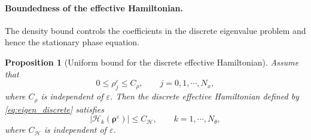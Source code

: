 \documentclass[11pt]{article}
\numberwithin{equation}{section}
\newtheorem{proposition}{Proposition}[section]
\begin{document}
\paragraph{Boundedness of the effective Hamiltonian.}
The density bound controls the coefficients in the discrete eigenvalue problem
and hence the stationary phase equation.

%

\begin{proposition}[Uniform bound for the discrete effective Hamiltonian]
\label{prop:stationary_H_bound}
Assume that
\[
    0\le \rho_j^\varepsilon\le C_\rho,
    \qquad j=0,1,\cdots,N_x,
\]
where \(C_\rho\) is independent of \(\varepsilon\). Then the discrete
effective Hamiltonian defined by \eqref{eq:eigen_discrete} satisfies
\[
    |\mathcal H_k(\boldsymbol\rho^\varepsilon)|
    \le C_{\mathcal H},
    \qquad k=1,\cdots,N_\theta,
\]
where \(C_{\mathcal H}\) is independent of \(\varepsilon\).
\end{proposition}
\end{document}
